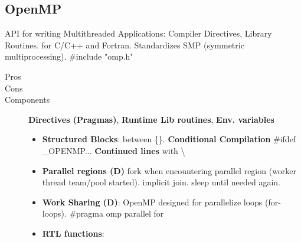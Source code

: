 \subsection*{OpenMP}
API for writing Multithreaded Applications: Compiler Directives, Library Routines. for C/C++ and Fortran. Standardizes SMP (symmetric multiprocessing). #include "omp.h"
\begin{description}
    \item[Pros] %
    \item[Cons] %
    \item[Components]\textbf{Directives (Pragmas)}, \textbf{Runtime Lib routines}, \textbf{Env. variables} %
    \begin{itemize}
    \item \textbf{Structured Blocks}: between \{\}. \textbf{Conditional Compilation} #ifdef \_OPENMP... \textbf{Continued lines} with \textbackslash
        \item \textbf{Parallel regions (D)} fork when encountering parallel region (worker thread team/pool started). implicit join. sleep until needed again.
        \item \textbf{Work Sharing (D)}: OpenMP designed for parallelize loops (for-loops). #pragma omp parallel for
        \item \textbf{RTL functions}: %
    \end{itemize}
\end{description}
